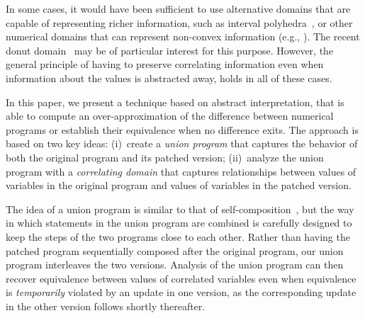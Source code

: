 In some cases, it would have been sufficient to use alternative domains that
are capable of representing richer information, such as interval
polyhedra~\cite{CMWC:SAS09}, or other numerical domains that can represent
non-convex information (e.g., \cite{TODO}). The recent donut
domain~\cite{GIBMG:VMCAI12} may be of particular interest for this purpose.
However, the general principle of having to preserve correlating information
even when information about the values is abstracted away, holds in all of
these cases.






In this paper, we present a technique based on abstract interpretation, that
is able to compute an over-approximation of the difference between numerical
programs or establish their equivalence when no difference exits. The
approach is based on two key ideas: (i)~create a \emph{union program} that
captures the behavior of both the original program and its patched version;
(ii)~analyze the union program with a \emph{correlating domain} that captures
relationships between values of variables in the original program and values
of variables in the patched version.

The idea of a union program is similar to that of
self-composition~\cite{BartheDArgenioRezk04,AikenTerauchi05}, but the way in
which statements in the union program are combined is carefully designed to
keep the steps of the two programs close to each other. Rather than having
the patched program sequentially composed after the original program, our
union program interleaves the two versions. Analysis of the union program can
then recover equivalence between values of correlated variables even when
equivalence is \emph{temporarily} violated by an update in one version, as
the corresponding update in the other version follows shortly thereafter.




